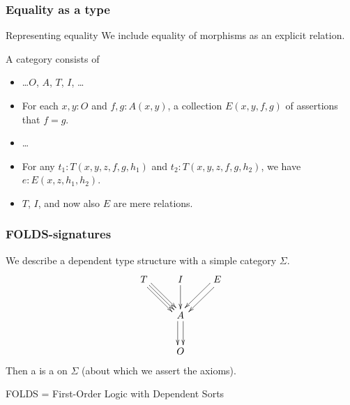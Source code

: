 \documentclass{beamer}
\begin{document}
\begin{frame}[t]
  \frametitle{Equality as a type}
  \begin{block}{Representing equality}
    We include \alert{equality of morphisms} as an explicit relation.
  \end{block}
  A category consists of
  \begin{itemize}
  \item \dots $O$, $A$, $T$, $I$, \dots
  \item For each $x,y:O$ and $f,g:A(x,y)$, a collection $E(x,y,f,g)$ of \alert{assertions that $f=g$}.
  \item \dots
    \pause
  \item For any $t_1:T(x,y,z,f,g,h_1)$ and $t_2:T(x,y,z,f,g,h_2)$, we have $e : E(x,z,h_1,h_2)$.
    \pause
  \item $T$, $I$, and now also $E$ are mere relations.
  \end{itemize}
\end{frame}

\begin{frame}
  \frametitle{FOLDS-signatures}
  We describe a dependent type structure with a \alert{simple category} $\Sigma$.
  \[
  \vcenter{\xymatrix{
      T \ar[dr] \ar@<1mm>[dr] \ar@<-1mm>[dr] & I \ar[d] & E \ar@<1mm>[dl] \ar@<-1mm>[dl] \\
      & A \ar@<1mm>[d] \ar@<-1mm>[d] \\
      & O}}
  \]
  Then a  is a  on $\Sigma$ (about which we assert the axioms).

  \medskip
  \alert{FOLDS} = \alert{F}irst-\alert{O}rder \alert{L}ogic with \alert{D}ependent \alert{S}orts
\end{frame}
\end{document}
